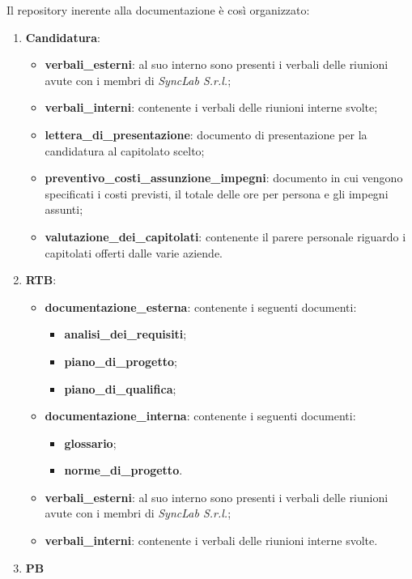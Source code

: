Il repository inerente alla documentazione è così organizzato:
\begin{enumerate}
	\item \textbf{Candidatura}:
	      \begin{itemize}
		      \item \textbf{verbali\_esterni}: al suo interno sono presenti i verbali delle riunioni avute con i membri di \textit{SyncLab S.r.l.};
		      \item \textbf{verbali\_interni}: contenente i verbali delle riunioni interne svolte;
		      \item \textbf{lettera\_di\_presentazione}: documento di presentazione per la candidatura al capitolato scelto;
		      \item \textbf{preventivo\_costi\_assunzione\_impegni}: documento in cui vengono specificati i costi previsti, il totale delle ore per persona e gli impegni assunti;
		      \item \textbf{valutazione\_dei\_capitolati}: contenente il parere personale riguardo i capitolati offerti dalle varie aziende.
	      \end{itemize}
	\item \textbf{RTB}:
	      \begin{itemize}
		      \item \textbf{documentazione\_esterna}: contenente i seguenti documenti:
		            \begin{itemize}
			            \item \textbf{analisi\_dei\_requisiti};
			            \item \textbf{piano\_di\_progetto};
			            \item \textbf{piano\_di\_qualifica};
		            \end{itemize}
		      \item \textbf{documentazione\_interna}: contenente i seguenti documenti:
		            \begin{itemize}
			            \item \textbf{glossario};
			            \item \textbf{norme\_di\_progetto}.
		            \end{itemize}
		      \item \textbf{verbali\_esterni}: al suo interno sono presenti i verbali delle riunioni avute con i membri di \textit{SyncLab S.r.l.};
		      \item \textbf{verbali\_interni}: contenente i verbali delle riunioni interne svolte.
	      \end{itemize}
	\item \textbf{PB} %
\end{enumerate}

